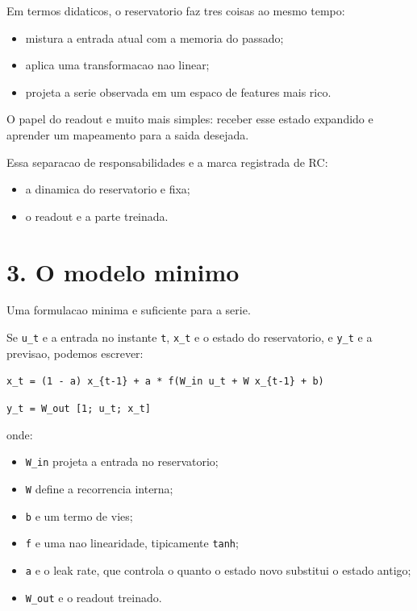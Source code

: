 \documentclass[12pt]{article}
\providecommand{\tightlist}{%
  \setlength{\itemsep}{0pt}\setlength{\parskip}{0pt}}
\begin{document}
Em termos didaticos, o reservatorio faz tres coisas ao mesmo tempo:

\begin{itemize}
\tightlist
\item
  mistura a entrada atual com a memoria do passado;
\item
  aplica uma transformacao nao linear;
\item
  projeta a serie observada em um espaco de features mais rico.
\end{itemize}

O papel do readout e muito mais simples: receber esse estado expandido e aprender um mapeamento para a saida desejada.

Essa separacao de responsabilidades e a marca registrada de RC:

\begin{itemize}
\tightlist
\item
  a dinamica do reservatorio e fixa;
\item
  o readout e a parte treinada.
\end{itemize}

\section{3. O modelo minimo}\label{3-o-modelo-minimo}

Uma formulacao minima e suficiente para a serie.

Se \texttt{u\_t} e a entrada no instante \texttt{t}, \texttt{x\_t} e o estado do reservatorio, e \texttt{y\_t} e a previsao, podemos escrever:

\texttt{x\_t\ =\ (1\ -\ a)\ x\_\{t-1\}\ +\ a\ *\ f(W\_in\ u\_t\ +\ W\ x\_\{t-1\}\ +\ b)}

\texttt{y\_t\ =\ W\_out\ {[}1;\ u\_t;\ x\_t{]}}

onde:

\begin{itemize}
\tightlist
\item
  \texttt{W\_in} projeta a entrada no reservatorio;
\item
  \texttt{W} define a recorrencia interna;
\item
  \texttt{b} e um termo de vies;
\item
  \texttt{f} e uma nao linearidade, tipicamente \texttt{tanh};
\item
  \texttt{a} e o leak rate, que controla o quanto o estado novo substitui o estado antigo;
\item
  \texttt{W\_out} e o readout treinado.
\end{itemize}
\end{document}
